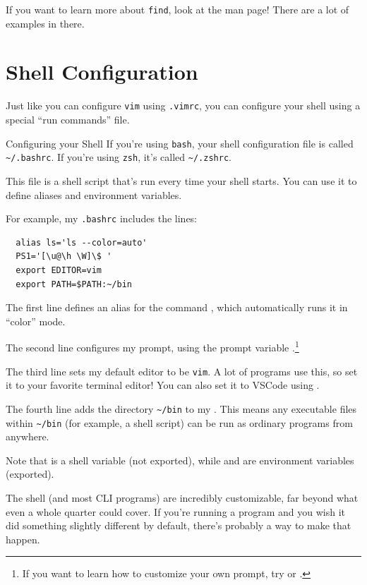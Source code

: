 If you want to learn more about \texttt{find}, look at the man page!  There are
a lot of examples in there.

\section{Shell Configuration}

Just like you can configure \texttt{vim} using \texttt{.vimrc}, you can
configure your shell using a special \enquote{run commands} file.

\begin{frame}[fragile]{Configuring your Shell}
  If you're using \texttt{bash}, your shell configuration file is called
  \texttt{\textasciitilde/.bashrc}.  If you're using \texttt{zsh}, it's called
  \texttt{\textasciitilde/.zshrc}.

  This file is a shell script that's run every time your shell starts.  You can
  use it to define aliases and environment variables.

  For example, my \texttt{.bashrc} includes the lines:
  \begin{verbatim}
  alias ls='ls --color=auto'
  PS1='[\u@\h \W]\$ '
  export EDITOR=vim
  export PATH=$PATH:~/bin
  \end{verbatim}

   {
    The first line defines an alias for the command , which
    automatically runs it in \enquote{color} mode.

    The second line configures my prompt, using the prompt variable
    .\footnote{If you want to learn how to customize your own prompt,
    try  or .}

    The third line sets my default editor to be \texttt{vim}.  A lot of
    programs use this, so set it to your favorite terminal editor!  You can
    also set it to VSCode using .

    The fourth line adds the directory \texttt{\textasciitilde/bin} to my
    .  This means any executable files within
    \texttt{\textasciitilde/bin} (for example, a shell script) can be run as
    ordinary programs from anywhere.

    Note that  is a shell variable (not exported), while 
    and  are environment variables (exported).
  }
\end{frame}

The shell (and most CLI programs) are incredibly customizable, far beyond what
even a whole quarter could cover.  If you're running a program and you wish it
did something slightly different by default, there's probably a way to make
that happen.

